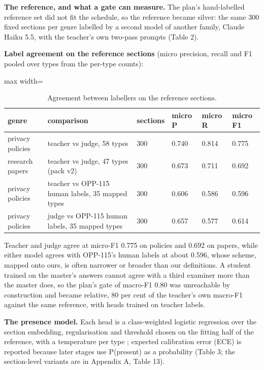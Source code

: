 \documentclass[11pt,a4paper]{article}
\newcommand{\panel}[1]{\par\medskip\noindent #1\par\smallskip}
\begin{document}
\textbf{The reference, and what a gate can measure.} The plan's hand-labelled reference set did not fit the schedule, so the reference became silver: the same 300 fixed sections per genre labelled by a second model of another family, Claude Haiku 5.5, with the teacher's own two-pass prompts (Table 2).

\begin{table}[!htbp]
\centering\small
\panel{\textbf{Label agreement on the reference sections} (micro precision, recall and F1 pooled over types from the per-type counts):}
\begin{adjustbox}{max width=\linewidth}
\begin{tabular}{llllll}
\toprule
genre & comparison & sections & micro P & micro R & micro F1 \\
\midrule
privacy policies & teacher vs judge, 58 types & 300 & 0.740 & 0.814 & 0.775 \\
research papers & teacher vs judge, 47 types (pack v2) & 300 & 0.673 & 0.711 & 0.692 \\
privacy policies & teacher vs OPP-115 human labels, 35 mapped types & 300 & 0.606 & 0.586 & 0.596 \\
privacy policies & judge vs OPP-115 human labels, 35 mapped types & 300 & 0.657 & 0.577 & 0.614 \\
\bottomrule
\end{tabular}
\end{adjustbox}
\caption{Agreement between labellers on the reference sections.}
\end{table}

Teacher and judge agree at micro-F1 0.775 on policies and 0.692 on papers, while either model agrees with OPP-115's human labels at about 0.596, whose scheme, mapped onto ours, is often narrower or broader than our definitions.  A student trained on the master's answers cannot agree with a third examiner more than the master does, so the plan's gate of macro-F1 0.80 was unreachable by construction and became relative, 80 per cent of the teacher's own macro-F1 against the same reference, with heads trained on teacher labels.

\textbf{The presence model.} Each head is a class-weighted logistic regression over the section embedding, regularisation and threshold chosen on the fitting half of the reference, with a temperature per type \cite{r24}; expected calibration error (ECE) \cite{r25} is reported because later stages use P(present) as a probability (Table 3; the section-level variants are in Appendix A, Table 13).
\end{document}
